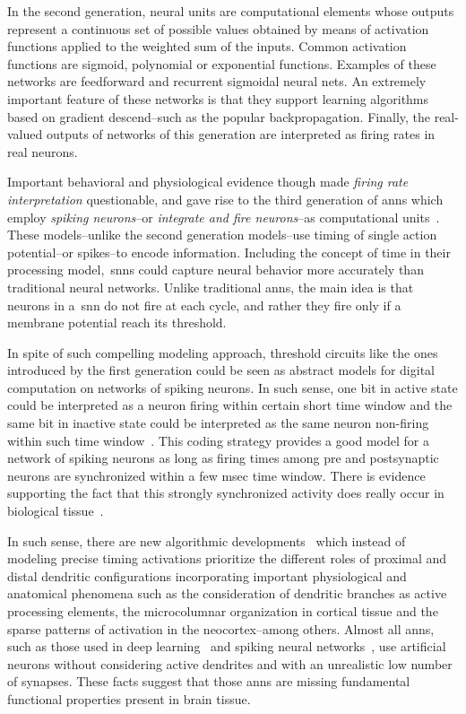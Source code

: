 {In the second generation, neural units are computational elements whose outputs represent a continuous set of possible values obtained by means of activation functions applied to the weighted sum of the inputs. Common activation functions are sigmoid, polynomial or exponential functions. Examples of these networks are feedforward and recurrent sigmoidal neural nets. An extremely important feature of these networks is that they support learning algorithms based on gradient descend--such as the popular backpropagation. Finally, the real-valued outputs of networks of this generation are interpreted as firing rates in real neurons. 

Important behavioral and physiological evidence though made \emph{firing rate interpretation} questionable, and gave rise to the third generation of \glspl{ann} which employ \emph{spiking neurons}--or \emph{integrate and fire neurons}--as computational units~\cite{HODGKIN199025,Izhikevich2004SpiketimingDO,1333071}. These models--unlike the second generation models--use timing of single action potential--or spikes--to encode information. Including the concept of time in their processing model,~\glspl{snn} could capture neural behavior more accurately than traditional neural networks. Unlike traditional \glspl{ann}, the main idea is that neurons in a~\gls{snn} do not fire at each cycle, and rather they fire only if a membrane potential reach its threshold.

In spite of such compelling modeling approach, threshold circuits like the ones introduced by the first generation could be seen as abstract models for digital computation on networks of spiking neurons. In such sense, one bit in active state could be interpreted as a neuron firing within certain short time window and the same bit in inactive state could be interpreted as the same neuron non-firing within such time window~\cite{Valiant:1994:CM:199266}. This coding strategy provides a good model for a network of spiking neurons as long as firing times among pre and postsynaptic neurons are synchronized within a few msec time window. There is evidence supporting the fact that this strongly synchronized activity does really occur in biological tissue~\cite{Abeles1993SpatiotemporalFP,bair1994}.

In such sense, there are new algorithmic developments~\cite{10.3389/fncir.2016.00023,10.1371/journal.pone.0217966} which instead of modeling precise timing activations prioritize the different roles of proximal and distal dendritic configurations incorporating important physiological and anatomical phenomena such as the consideration of dendritic branches as active processing elements, the microcolumnar organization in cortical tissue and the sparse patterns of activation in the neocortex--among others. Almost all \glspl{ann}, such as those used in deep learning~\cite{lecun_deep_2015} and spiking neural networks~\cite{MAASS19971659}, use artificial neurons without considering active dendrites and with an unrealistic low number of synapses. These facts suggest that those \glspl{ann} are missing fundamental functional properties present in brain tissue. 
}

